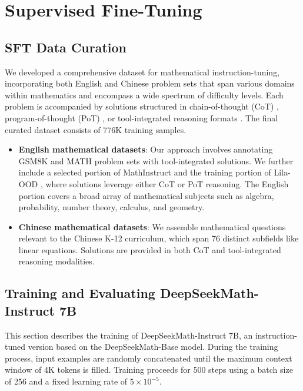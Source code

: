 \section{Supervised Fine-Tuning}

\subsection{SFT Data Curation}

We developed a comprehensive dataset for mathematical instruction-tuning, incorporating both English and Chinese problem sets that span various domains within mathematics and encompass a wide spectrum of difficulty levels. Each problem is accompanied by solutions structured in chain-of-thought (CoT) \citep{cot}, program-of-thought (PoT) \citep{pot,pal}, or tool-integrated reasoning formats \citep{tora}. The final curated dataset consists of 776K training samples.

\begin{itemize}[topsep=0pt]
    \item \textbf{English mathematical datasets}: Our approach involves annotating GSM8K and MATH problem sets with tool-integrated solutions. We further include a selected portion of MathInstruct \citep{MathInstruct} and the training portion of Lila-OOD \citep{lila}, where solutions leverage either CoT or PoT reasoning. The English portion covers a broad array of mathematical subjects such as algebra, probability, number theory, calculus, and geometry.
    \item \textbf{Chinese mathematical datasets}: We assemble mathematical questions relevant to the Chinese K-12 curriculum, which span 76 distinct subfields like linear equations. Solutions are provided in both CoT and tool-integrated reasoning modalities.
\end{itemize}

\subsection{Training and Evaluating DeepSeekMath-Instruct 7B}

This section describes the training of DeepSeekMath-Instruct 7B, an instruction-tuned version based on the DeepSeekMath-Base model. During the training process, input examples are randomly concatenated until the maximum context window of 4K tokens is filled. Training proceeds for 500 steps using a batch size of 256 and a fixed learning rate of $5\times 10^{-5}$.

